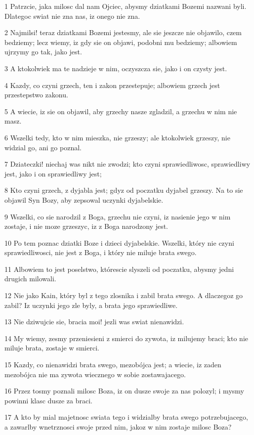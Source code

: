 \par 1 Patrzcie, jaka milosc dal nam Ojciec, abysmy dziatkami Bozemi nazwani byli. Dlategoc swiat nie zna nas, iz onego nie zna.
\par 2 Najmilsi! teraz dziatkami Bozemi jestesmy, ale sie jeszcze nie objawilo, czem bedziemy; lecz wiemy, iz gdy sie on objawi, podobni mu bedziemy; albowiem ujrzymy go tak, jako jest.
\par 3 A ktokolwiek ma te nadzieje w nim, oczyszcza sie, jako i on czysty jest.
\par 4 Kazdy, co czyni grzech, ten i zakon przestepuje; albowiem grzech jest przestepstwo zakonu.
\par 5 A wiecie, iz sie on objawil, aby grzechy nasze zgladzil, a grzechu w nim nie masz.
\par 6 Wszelki tedy, kto w nim mieszka, nie grzeszy; ale ktokolwiek grzeszy, nie widzial go, ani go poznal.
\par 7 Dziateczki! niechaj was nikt nie zwodzi; kto czyni sprawiedliwosc, sprawiedliwy jest, jako i on sprawiedliwy jest;
\par 8 Kto czyni grzech, z dyjabla jest; gdyz od poczatku dyjabel grzeszy. Na to sie objawil Syn Bozy, aby zepsowal uczynki dyjabelskie.
\par 9 Wszelki, co sie narodzil z Boga, grzechu nie czyni, iz nasienie jego w nim zostaje, i nie moze grzeszyc, iz z Boga narodzony jest.
\par 10 Po tem poznac dziatki Boze i dzieci dyjabelskie. Wszelki, który nie czyni sprawiedliwosci, nie jest z Boga, i który nie miluje brata swego.
\par 11 Albowiem to jest poselstwo, którescie slyszeli od poczatku, abysmy jedni drugich milowali.
\par 12 Nie jako Kain, który byl z tego zlosnika i zabil brata swego. A dlaczegoz go zabil? Iz uczynki jego zle byly, a brata jego sprawiedliwe.
\par 13 Nie dziwujcie sie, bracia moi! jezli was swiat nienawidzi.
\par 14 My wiemy, zesmy przeniesieni z smierci do zywota, iz milujemy braci; kto nie miluje brata, zostaje w smierci.
\par 15 Kazdy, co nienawidzi brata swego, mezobójca jest; a wiecie, iz zaden mezobójca nie ma zywota wiecznego w sobie zostawajacego.
\par 16 Przez tosmy poznali milosc Boza, iz on dusze swoje za nas polozyl; i mysmy powinni klasc dusze za braci.
\par 17 A kto by mial majetnosc swiata tego i widzialby brata swego potrzebujacego, a zawarlby wnetrznosci swoje przed nim, jakoz w nim zostaje milosc Boza?
